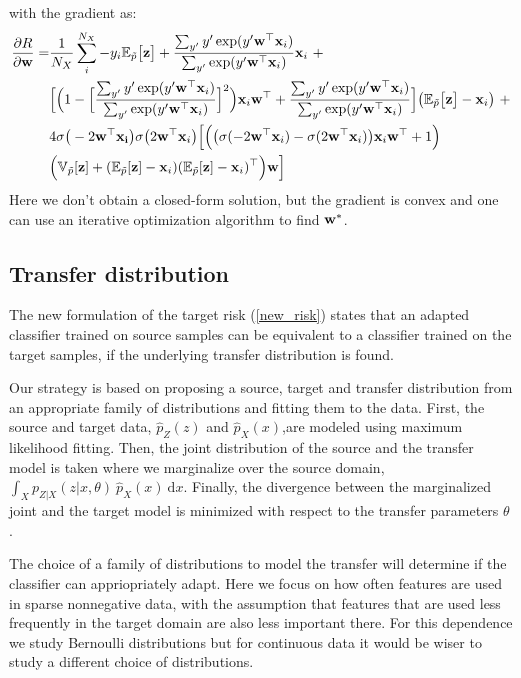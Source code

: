 \documentclass[twoside,11pt]{article}
\begin{document}
with the gradient as:
\begin{align}
\frac{\partial R }{\partial{\bf w}} =& \frac{1}{N_{X}} \sum_{i}^{N_{X}} -y_{i}\mathbb{E}_{\tilde{p}}\big[{\bf z}\big] + \frac{\sum_{y'} y'\exp(y'{\bf w}^{\top}{\bf x}_{i})}{\sum_{y'}\exp(y'{\bf w}^{\top}{\bf x}_{i})}{\bf x}_{i} \ + \nonumber \\
& \Big[\Big(1-\Big[\frac{\sum_{y'}y'\exp(y'{\bf w}^{\top}{\bf x}_{i})}{\sum_{y'}\exp(y'{\bf w}^{\top}{\bf x}_{i})}\Big]^{2}\Big) {\bf x}_{i}{\bf w}^{\top} + \frac{\sum_{y'} y'\exp(y'{\bf w}^{\top}{\bf x}_{i})}{\sum_{y'}\exp(y'{\bf w}^{\top}{\bf x}_{i})}\Big]\big(\mathbb{E}_{\tilde{p}}\big[{\bf z} \big]-{\bf x}_{i}\big) \ + \nonumber \\
& 4\sigma \big(-2{\bf w^{\top}x_{i}}\big)\sigma \big(2{\bf w^{\top}x}_{i}\big)\Big[\Big(\big(\sigma(-2{\bf w}^{\top}{\bf x}_{i}) - \sigma(2{\bf w}^{\top}{\bf x}_{i})\big){\bf x}_{i}{\bf w}^{\top} + 1\Big) \nonumber \\
& \Big(\mathbb{V}_{\tilde{p}}[{\bf z}] + (\mathbb{E}_{\tilde{p}}[{\bf z}]-{\bf x}_{i})(\mathbb{E}_{\tilde{p}}[{\bf z}]-{\bf x}_{i})^{\top} \Big){\bf w}\Big]
\end{align}
Here we don't obtain a closed-form solution, but the gradient is convex and one can use an iterative optimization algorithm to find ${\bf w}^{*}$.

\subsection{Transfer distribution}
The new formulation of the target risk (\ref{new_risk}) states that an adapted classifier trained on source samples can be equivalent to a classifier trained on the target samples, if the underlying transfer distribution is found.

Our strategy is based on proposing a source, target and transfer distribution from an appropriate family of distributions and fitting them to the data. First, the source and target data, $\hat{p}_{Z}(z)$ and $\hat{p}_{X}(x)$,are modeled using maximum likelihood fitting. Then, the joint distribution of the source and the transfer model is taken where we marginalize over the source domain, $\int_{X} p_{Z|X}(z|x, \theta) \ \hat{p}_{X}(x) \ \mathrm{d}x$. Finally, the divergence between the marginalized joint and the target model is minimized with respect to the transfer parameters $\theta$.

The choice of a family of distributions to model the transfer will determine if the classifier can appriopriately adapt. Here we focus on how often features are used in sparse nonnegative data, with the assumption that features that are used less frequently in the target domain are also less important there. For this dependence we study Bernoulli distributions but for continuous data it would be wiser to study a different choice of distributions.
\end{document}
